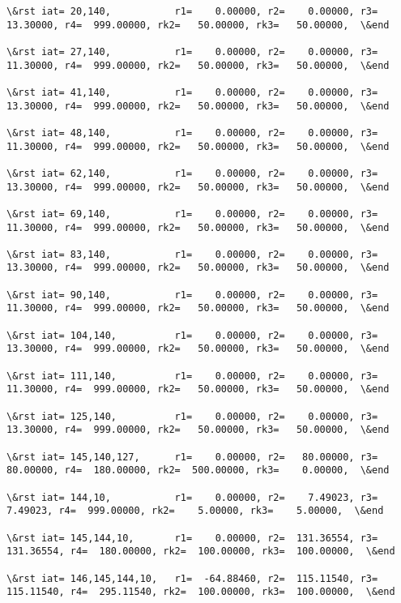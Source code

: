 \documentclass[11pt]{article}
\begin{document}
\begin{Verbatim}[commandchars=\\\{\}]
\&rst iat= 20,140,           r1=    0.00000, r2=    0.00000, r3=   13.30000, r4=  999.00000, rk2=   50.00000, rk3=   50.00000,  \&end

\&rst iat= 27,140,           r1=    0.00000, r2=    0.00000, r3=   11.30000, r4=  999.00000, rk2=   50.00000, rk3=   50.00000,  \&end

\&rst iat= 41,140,           r1=    0.00000, r2=    0.00000, r3=   13.30000, r4=  999.00000, rk2=   50.00000, rk3=   50.00000,  \&end

\&rst iat= 48,140,           r1=    0.00000, r2=    0.00000, r3=   11.30000, r4=  999.00000, rk2=   50.00000, rk3=   50.00000,  \&end

\&rst iat= 62,140,           r1=    0.00000, r2=    0.00000, r3=   13.30000, r4=  999.00000, rk2=   50.00000, rk3=   50.00000,  \&end

\&rst iat= 69,140,           r1=    0.00000, r2=    0.00000, r3=   11.30000, r4=  999.00000, rk2=   50.00000, rk3=   50.00000,  \&end

\&rst iat= 83,140,           r1=    0.00000, r2=    0.00000, r3=   13.30000, r4=  999.00000, rk2=   50.00000, rk3=   50.00000,  \&end

\&rst iat= 90,140,           r1=    0.00000, r2=    0.00000, r3=   11.30000, r4=  999.00000, rk2=   50.00000, rk3=   50.00000,  \&end

\&rst iat= 104,140,          r1=    0.00000, r2=    0.00000, r3=   13.30000, r4=  999.00000, rk2=   50.00000, rk3=   50.00000,  \&end

\&rst iat= 111,140,          r1=    0.00000, r2=    0.00000, r3=   11.30000, r4=  999.00000, rk2=   50.00000, rk3=   50.00000,  \&end

\&rst iat= 125,140,          r1=    0.00000, r2=    0.00000, r3=   13.30000, r4=  999.00000, rk2=   50.00000, rk3=   50.00000,  \&end

\&rst iat= 145,140,127,      r1=    0.00000, r2=   80.00000, r3=   80.00000, r4=  180.00000, rk2=  500.00000, rk3=    0.00000,  \&end

\&rst iat= 144,10,           r1=    0.00000, r2=    7.49023, r3=    7.49023, r4=  999.00000, rk2=    5.00000, rk3=    5.00000,  \&end

\&rst iat= 145,144,10,       r1=    0.00000, r2=  131.36554, r3=  131.36554, r4=  180.00000, rk2=  100.00000, rk3=  100.00000,  \&end

\&rst iat= 146,145,144,10,   r1=  -64.88460, r2=  115.11540, r3=  115.11540, r4=  295.11540, rk2=  100.00000, rk3=  100.00000,  \&end


\end{Verbatim}
\end{document}
